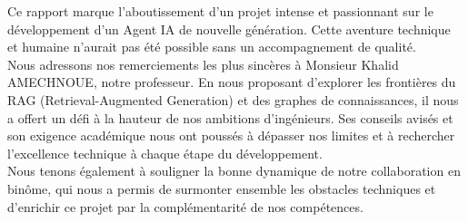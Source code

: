Ce rapport marque l'aboutissement d'un projet intense et passionnant sur le développement d'un Agent IA de nouvelle génération. Cette aventure technique et humaine n'aurait pas été possible sans un accompagnement de qualité.\\[0.1cm]

Nous adressons nos remerciements les plus sincères à Monsieur Khalid AMECHNOUE, notre professeur. En nous proposant d'explorer les frontières du RAG (Retrieval-Augmented Generation) et des graphes de connaissances, il nous a offert un défi à la hauteur de nos ambitions d'ingénieurs. Ses conseils avisés et son exigence académique nous ont poussés à dépasser nos limites et à rechercher l'excellence technique à chaque étape du développement.\\[0.1cm]

Nous tenons également à souligner la bonne dynamique de notre collaboration en binôme, qui nous a permis de surmonter ensemble les obstacles techniques et d'enrichir ce projet par la complémentarité de nos compétences.